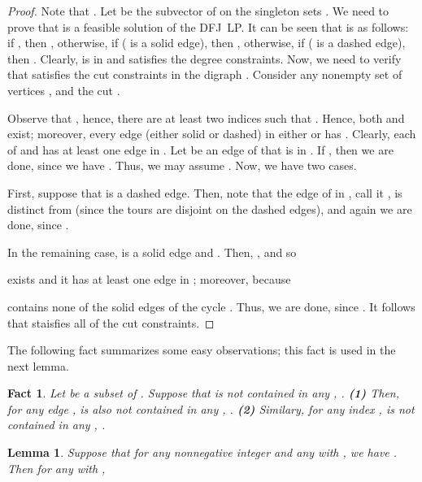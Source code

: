 \documentclass[11pt]{article}
\newtheorem{lemma}[theorem]{Lemma}
\newtheorem{fact}[theorem]{Fact}
\begin{document}
\begin{proof}
Note that .
Let  be the subvector of 
on the singleton sets .
We need to prove that  is a feasible
solution of the DFJ~LP.
It can be seen that  is as follows:
if , then ,
otherwise, if  ( is a solid edge), then ,
otherwise, if  ( is a dashed edge), then .
Clearly,  is in  and satisfies the degree constraints.
Now, we need to verify that  satisfies the cut constraints
in the digraph .
Consider any nonempty set of vertices , and the cut .

Observe that , hence, there are at least two indices
 such that .
Hence, both  and  exist;
moreover, every edge  (either solid or dashed) in either
 or  has .
Clearly, each of  and  has
at least one edge in .
Let  be an edge of  that is in .
If , then we are done,
since we have .
Thus, we may assume .
Now, we have two cases.

First, suppose that  is a dashed edge.
Then, note that the edge of  in ,
call it , is distinct from 
(since the tours are disjoint on the dashed edges),
and again we are done, since .

In the remaining case,  is a solid edge
and .
Then, , and so 

exists and it has at least one edge  in ;
moreover,  because 

contains none of the solid edges of the cycle .
Thus, we are done, since .
It follows that  staisfies all of the cut constraints.

\end{proof}


The following fact summarizes some easy observations;
this fact is  used in the next lemma.

\begin{fact}
\label{fact:set-intour}
Let  be a subset of .
Suppose that  is not contained in any
, .
\textbf{(1)}
Then, for any edge ,
 is also not contained in any
, .
\textbf{(2)}
Similary, for any index ,
 is not contained in any
, .
\end{fact}



\begin{lemma}
\label{lemma:dfj-cond1}
Suppose that for any nonnegative integer  and
any  with ,
we have . Then for any  with ,

\end{lemma}
\end{document}
